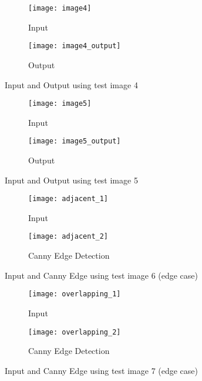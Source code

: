 \documentclass[journal]{IEEEtran}
\begin{document}
\begin{figure}
	\centering
	\begin{subfigure}{.25\textwidth}
		\centering
		\texttt{[image: image4]}
		\caption{Input}
		\label{fig:results4_sub1}
	\end{subfigure}%
	\begin{subfigure}{.25\textwidth}
		\centering
		\texttt{[image: image4\_output]}
		\caption{Output}
		\label{fig:results4_sub2}
	\end{subfigure}
	\caption{Input and Output using test image 4}
	\label{fig:results4}
\end{figure}

\begin{figure}
	\centering
	\begin{subfigure}{.25\textwidth}
		\centering
		\texttt{[image: image5]}
		\caption{Input}
		\label{fig:results5_sub1}
	\end{subfigure}%
	\begin{subfigure}{.25\textwidth}
		\centering
		\texttt{[image: image5\_output]}
		\caption{Output}
		\label{fig:results5_sub2}
	\end{subfigure}
	\caption{Input and Output using test image 5}
	\label{fig:results5}
\end{figure}

\begin{figure}
	\centering
	\begin{subfigure}{.25\textwidth}
		\centering
		\texttt{[image: adjacent\_1]}
		\caption{Input}
		\label{fig:adjacent_sub1}
	\end{subfigure}%
	\begin{subfigure}{.25\textwidth}
		\centering
		\texttt{[image: adjacent\_2]}
		\caption{Canny Edge Detection}
		\label{fig:adjacent_sub2}
	\end{subfigure}
	\caption{Input and Canny Edge using test image 6 (edge case)}
	\label{fig:adjancet}
\end{figure}

\begin{figure}
	\centering
	\begin{subfigure}{.25\textwidth}
		\centering
		\texttt{[image: overlapping\_1]}
		\caption{Input}
		\label{fig:overlapping_sub1}
	\end{subfigure}%
	\begin{subfigure}{.25\textwidth}
		\centering
		\texttt{[image: overlapping\_2]}
		\caption{Canny Edge Detection}
		\label{fig:overlapping_sub2}
	\end{subfigure}
	\caption{Input and Canny Edge using test image 7 (edge case)}
	\label{fig:overlapping}
\end{figure}
\end{document}
